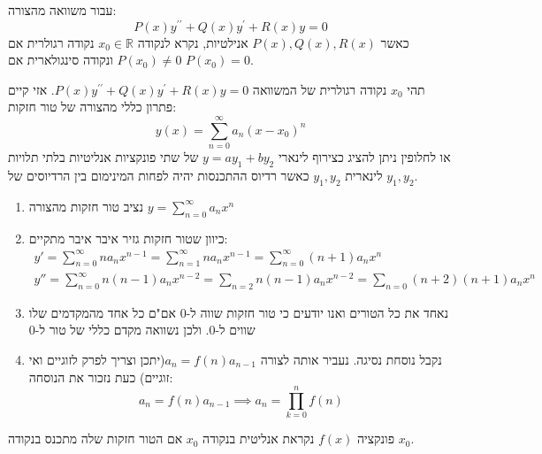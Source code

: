 \documentclass{tstextbook}
\begin{document}
\begin{definition}
עבור משוואה מהצורה:
$$P\left(x\right)y^{\prime\prime}+Q\left(x\right)y^{\prime}+R\left(x\right)y=0$$
כאשר \(P(x),Q(x),R(x)\) אנילטיות, נקרא לנקודה \(x_{0} \in \mathbb{R}\) נקודה רגולרית אם \(P(x_{0})\neq 0\) ונקודה סינגולארית אם \(P(x_{0})=0\).

\end{definition}
\begin{proposition}
תהי \(x_{0}\) נקודה רגולרית של המשוואה \(P\left(x\right)y^{\prime\prime}+Q\left(x\right)y^{\prime}+R\left(x\right)y=0\). אזי קיים פתרון כללי מהצורה של טור חזקות:
$$y\left(x\right)=\sum_{n=0}^{\infty}a_{n}\left(x-x_{0}\right)^{n}$$
או לחלופין ניתן להציג כצירוף לינארי \(y=ay_{1}+by_{2}\) של שתי פונקציות אנליטיות בלתי תלויות לינארית \(y_{1},y_{2}\) כאשר רדיוס ההתכנסות יהיה לפחות המינימום בין הרדיוסים של \(y_{1},y_{2}\). 

\end{proposition}
\begin{proposition}
  \begin{enumerate}
    \item נציב טור חזקות מהצורה \(y=\sum_{n=0}^\infty a_{n}x^n\)


    \item כיוון שטור חזקות גזיר איבר איבר מתקיים: 
$$\begin{gather}y'=\sum_{n=0}^\infty na_{n}x^{n-1}=\sum_{n=1}^\infty n a_{n}x^{n-1}=\sum_{n=0}^\infty (n+1)a_{n}x^{n} \\y''=\sum_{n=0}^\infty n(n-1)a_{n}x^{n-2}=\sum_{n=2}n(n-1)a_{n}x^{n-2}=\sum_{n=0}(n+2)(n+1)a_{n}x^n
\end{gather}$$


    \item נאחד את כל הטורים ואנו יודעים כי טור חזקות שווה ל-0 אם"ם כל אחד מהמקדמים שלו שווים ל-0. ולכן נשוואה מקדם כללי של טור ל-0 


    \item נקבל נוסחת נסיגה. נעביר אותה לצורה \(a_{n}=f(n)a_{n-1}\)(יתכן וצריך לפרק לזוגיים ואי זוגיים) כעת נזכור את הנוסחה: 
$$a_{n}=f(n)a_{n-1}\implies a_{n}= \prod_{k=0}^n f(n)$$


  \end{enumerate}
\end{proposition}
\begin{reminder}
פונקציה \(f(x)\) נקראת אנליטית בנקודה \(x_{0}\) אם הטור חזקות שלה מתכנס בנקודה \(x_{0}\).

\end{reminder}
\end{document}
